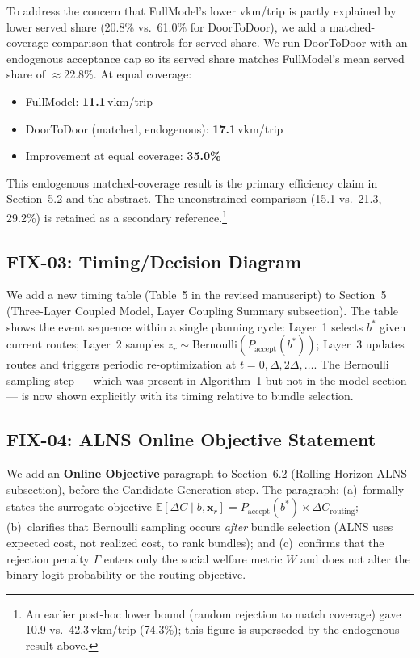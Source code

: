 \documentclass[12pt]{article}
\begin{document}
To address the concern that FullModel's lower vkm/trip is partly explained by
lower served share (20.8\% vs.\ 61.0\% for DoorToDoor), we add a matched-coverage
comparison that controls for served share. We run DoorToDoor with an endogenous
acceptance cap so its served share matches FullModel's mean served share of
$\approx$22.8\%. At equal coverage:
\begin{itemize}
  \item FullModel: \textbf{11.1}\,vkm/trip
  \item DoorToDoor (matched, endogenous): \textbf{17.1}\,vkm/trip
  \item Improvement at equal coverage: \textbf{35.0\%}
\end{itemize}
This endogenous matched-coverage result is the primary efficiency claim in
Section~5.2 and the abstract. The unconstrained comparison (15.1 vs.\ 21.3,
29.2\%) is retained as a secondary reference.\footnote{An earlier post-hoc
lower bound (random rejection to match coverage) gave 10.9 vs.\ 42.3\,vkm/trip
(74.3\%); this figure is superseded by the endogenous result above.}

\subsection*{FIX-03: Timing/Decision Diagram}

We add a new timing table (Table~5 in the revised manuscript) to Section~5
(Three-Layer Coupled Model, Layer Coupling Summary subsection). The table shows
the event sequence within a single planning cycle: Layer~1 selects $b^*$ given
current routes; Layer~2 samples $z_r \sim \mathrm{Bernoulli}(P_{\text{accept}}(b^*))$;
Layer~3 updates routes and triggers periodic re-optimization at
$t = 0, \Delta, 2\Delta, \ldots$. The Bernoulli sampling step --- which was
present in Algorithm~1 but not in the model section --- is now shown explicitly
with its timing relative to bundle selection.

\subsection*{FIX-04: ALNS Online Objective Statement}

We add an \textbf{Online Objective} paragraph to Section~6.2 (Rolling Horizon
ALNS subsection), before the Candidate Generation step. The paragraph:
(a)~formally states the surrogate objective
$\mathbb{E}[\Delta C \mid b, \mathbf{x}_r] = P_{\text{accept}}(b^*) \times
\Delta C_{\text{routing}}$; (b)~clarifies that Bernoulli sampling occurs
\emph{after} bundle selection (ALNS uses expected cost, not realized cost, to
rank bundles); and (c)~confirms that the rejection penalty $\Gamma$ enters only
the social welfare metric $W$ and does not alter the binary logit probability or
the routing objective.
\end{document}
